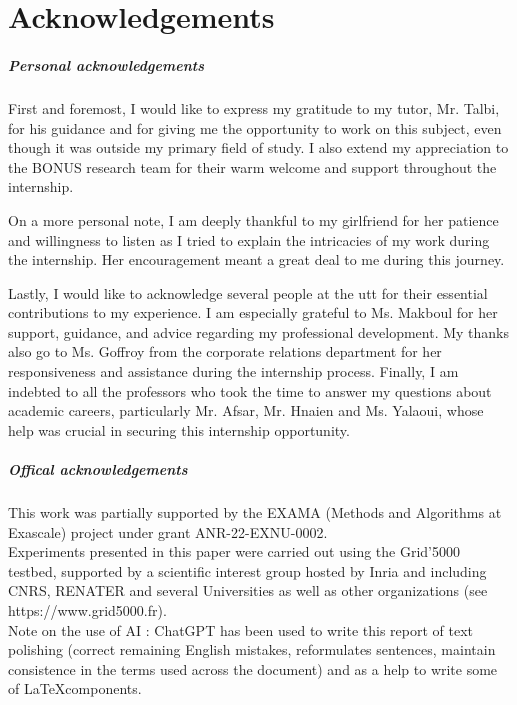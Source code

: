 \chapter*{Acknowledgements}

\paragraph{Personal acknowledgements}

First and foremost, I would like to express my gratitude to my tutor, Mr. Talbi, for his guidance and for giving me the opportunity to work on this subject, even though it was outside my primary field of study. I also extend my appreciation to the BONUS research team for their warm welcome and support throughout the internship.  

On a more personal note, I am deeply thankful to my girlfriend for her patience and willingness to listen as I tried to explain the intricacies of my work during the internship. Her encouragement meant a great deal to me during this journey.  

Lastly, I would like to acknowledge several people at the \acrfull{utt} for their essential contributions to my experience. I am especially grateful to Ms. Makboul for her support, guidance, and advice regarding my professional development. My thanks also go to Ms. Goffroy from the corporate relations department for her responsiveness and assistance during the internship process. Finally, I am indebted to all the professors who took the time to answer my questions about academic careers, particularly Mr. Afsar, Mr. Hnaien and Ms. Yalaoui, whose help was crucial in securing this internship opportunity.


\paragraph{Offical acknowledgements}
This work was partially supported by the EXAMA (Methods and Algorithms at Exascale) project under grant ANR-22-EXNU-0002.\\ 

Experiments presented in this paper were carried out using the Grid'5000 testbed, supported by a scientific interest group hosted by Inria and including CNRS, RENATER and several Universities as well as other organizations (see https://www.grid5000.fr).\\

Note on the use of AI : ChatGPT has been used to write this report of text polishing (correct remaining English mistakes, reformulates sentences, maintain consistence in the terms used across the document) and as a help to write some of \LaTeX components.